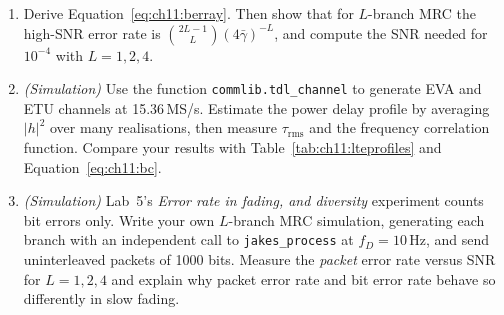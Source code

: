 \begin{enumerate}[label=\thechapter.\arabic*]
\begin{center}
\end{center}
\item Derive Equation~\eqref{eq:ch11:berray}. Then show that for $L$-branch MRC the high-SNR error
rate is $\binom{2L-1}{L}(4\bar\gamma)^{-L}$, and compute the SNR needed for $10^{-4}$ with $L=1,2,4$.
\item \emph{(Simulation)} Use the function \texttt{commlib.tdl\_channel} to generate EVA and
ETU channels at 15.36\,MS/s. Estimate the power delay profile by averaging $|h|^2$ over many
realisations, then measure $\tau_{\text{rms}}$ and the frequency correlation function. Compare
your results with Table~\ref{tab:ch11:lteprofiles} and Equation~\eqref{eq:ch11:bc}.
\item \emph{(Simulation)} Lab~5's \emph{Error rate in fading, and diversity} experiment counts bit
errors only. Write your own $L$-branch MRC simulation, generating each branch with an independent
call to \texttt{jakes\_process} at $f_D=10$\,Hz, and send uninterleaved packets of 1000 bits. Measure the
\emph{packet} error rate versus SNR for $L=1,2,4$ and explain why packet error rate and bit error rate
behave so differently in slow fading.
\begin{center}
\end{center}
\end{enumerate}

